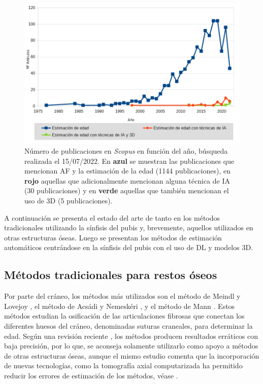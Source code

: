 \begin{figure}[h]
    \centering
    \includegraphics[width=\linewidth]{imagenes/stateOfArt/scopus_graph.png}
    \caption[Publicaciones por año de AF, AF+IA y AF+IA+3D en Scopus]{Número de publicaciones en \textit{Scopus} en función del año, búsqueda realizada el 15/07/2022. En {\color{Blue} \textbf{azul}} se muestran las publicaciones que mencionan AF y la estimación de la edad (1144 publicaciones), en {\color{Red} \textbf{rojo}} aquellas que adicionalmente mencionan alguna técnica de IA (30 publicaciones) y en {\color{LimeGreen} \textbf{verde}} aquellas que también mencionan el uso de 3D (5 publicaciones).}
    \label{fig:scopusData}
\end{figure}

A continuación se presenta el estado del arte de tanto en los métodos tradicionales utilizando la sínfisis del pubis y, brevemente, aquellos utilizados en otras estructuras óseas. Luego se presentan los métodos de estimación automáticos centrándose en la sínfisis del pubis con el uso de DL y modelos 3D.

\subsection{Métodos tradicionales para restos óseos}

Por parte del cráneo, los métodos más utilizados son el método de Meindl y Lovejoy \cite{meindl1985ectocranial}, el método de Acsádi y Nemeskéri \cite{acsadi1970history}, y el método de Mann \cite{mann1991maxillary}. Estos métodos estudian la osificación de las articulaciones fibrosas que conectan los diferentes huesos del cráneo, denominadas suturas craneales, para determinar la edad. Según una revisión reciente \cite{ruengdit2020cranial}, los métodos producen resultados erráticos con baja precisión, por lo que, se aconseja solamente utilizarlo como apoyo a métodos de otras estructuras óseas, aunque el mismo estudio comenta que la incorporación de nuevas tecnologías, como la tomografía axial computarizada ha permitido reducir los errores de estimación de los métodos, véase \cite{chiba2013age, boyd2015use}.

